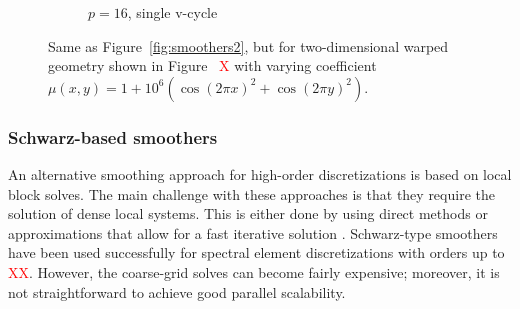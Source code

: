 \documentclass[smallcondensed,final]{svjour3}     %
\newcommand{\todo}[1]{\textcolor{red}{ #1}}
\begin{document}
\begin{figure}
\begin{subfigure}[b]{0.49\textwidth}
		\caption{$p=16$, single v-cycle}
	\end{subfigure}
	\caption{\label{fig:smoothers-var} Same as
          Figure~\ref{fig:smoothers2}, but for two-dimensional warped
          geometry shown in Figure~\todo{X} with varying coefficient
          $\mu(x,y) = 1 + 10^6(\cos(2\pi x)^2 + \cos(2\pi y)^2)$.}
\end{figure}


\subsubsection{Schwarz-based smoothers}\label{subsec:schwarz}
An alternative smoothing approach for high-order discretizations is
based on local block solves.  The main challenge with these approaches
is that they require the solution of dense local systems.  This is
either done by using direct methods or approximations that allow for a
fast iterative solution \cite{LottesFischer05,
  FischerLottes05}. Schwarz-type smoothers have been used successfully
for spectral element discretizations with orders up to \todo{XX}. However,
the coarse-grid solves can become fairly expensive; moreover, it is
not straightforward to achieve good parallel scalability.
\end{document}
